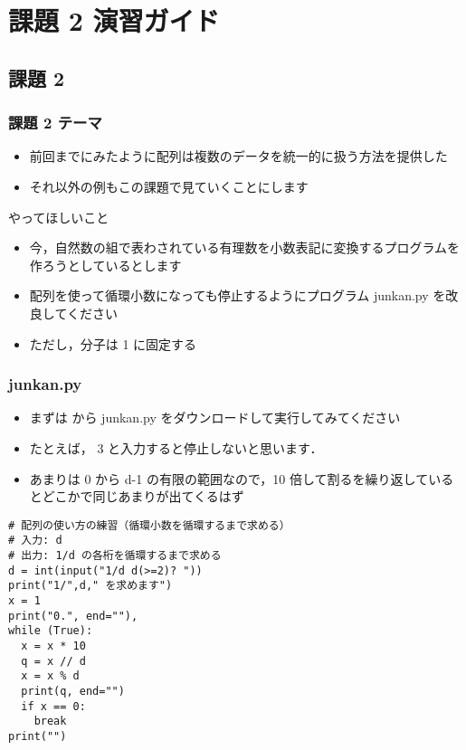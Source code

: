 %
%
\section{課題 2 演習ガイド}
\subsection{課題 2}
\begin{frame}[label=quiz2]
\frametitle{課題 2 テーマ}
  \begin{itemize}
\item 前回までにみたように配列は複数のデータを統一的に扱う方法を提供した
\item それ以外の例もこの課題で見ていくことにします
  \end{itemize}
  \begin{block}{やってほしいこと}
    \begin{itemize}
\item 今，自然数の組で表わされている有理数を小数表記に変換するプログラムを作ろうとしているとします
\item 配列を使って循環小数になっても停止するようにプログラム junkan.py を改良してください
\item ただし，分子は 1 に固定する
    \end{itemize}
  \end{block}
\end{frame}
\begin{frame}
\frametitle{junkan.py}
  \begin{itemize}
\item まずは\href{https://sites.google.com/presystems.xyz/elementarycs/top}{} から junkan.py をダウンロードして実行してみてください
\item たとえば， 3 と入力すると停止しないと思います．
\item あまりは 0 から d-1 の有限の範囲なので，10 倍して割るを繰り返しているとどこかで同じあまりが出てくるはず
  \end{itemize}
  \begin{lstlisting}[caption={junkan.py},label=lst:rational]
# 配列の使い方の練習（循環小数を循環するまで求める）
# 入力: d
# 出力: 1/d の各桁を循環するまで求める
d = int(input("1/d d(>=2)? "))
print("1/",d," を求めます")
x = 1
print("0.", end=""),
while (True):
  x = x * 10
  q = x // d
  x = x % d
  print(q, end="")
  if x == 0:
    break
print("")
  \end{lstlisting}
\end{frame}
